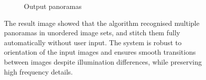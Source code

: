 \documentclass[conference]{IEEEtran}
\begin{document}
\begin{figure}[!h]
\begin{subfigure}[b]{0.4\linewidth}
    \caption{Output panoramas}
  \end{subfigure}
  \caption{The result image showed that the algorithm recognised multiple panoramas in unordered image
sets, and stitch them fully automatically without user input. The system is robust to orientation of the input images and ensures smooth transitions between images despite illumination differences, while preserving high frequency details.}
  \label{fig:coffee3}
\end{figure}
\end{document}
